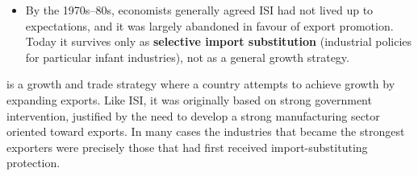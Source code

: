 \begin{itemize}
\begin{itemize}
    \item \textbf{Limits to long run growth}: many protected firms never grew up into efficient low-cost producers; firms that should have closed down were kept alive while potentially successful ones were not created.
  \end{itemize}
  \item By the 1970s--80s, economists generally agreed ISI had not lived up to expectations, and it was largely abandoned in favour of export promotion. Today it survives only as \textbf{selective import substitution} (industrial policies for particular infant industries), not as a general growth strategy.
\end{itemize}
 is a growth and trade strategy where a country attempts to achieve growth by expanding exports. Like ISI, it was originally based on strong government intervention, justified by the need to develop a strong manufacturing sector oriented toward exports. In many cases the industries that became the strongest exporters were precisely those that had first received import-substituting protection.

